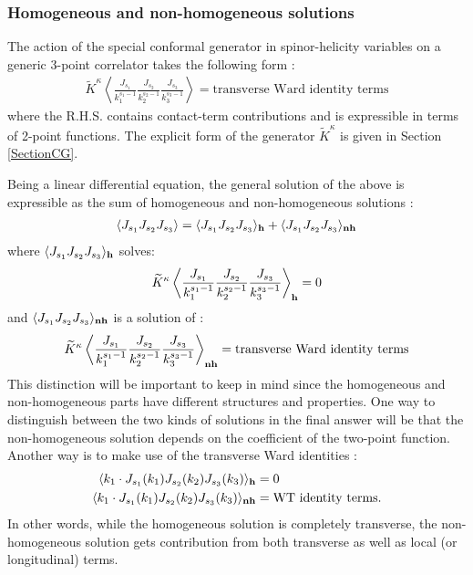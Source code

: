 \documentclass[a4paper,11pt]{article}
\begin{document}
\subsubsection{Homogeneous and non-homogeneous solutions}\label{hnh}
The action of the special conformal generator in spinor-helicity variables on a generic 3-point correlator takes the following form :
%
\begin{align}
\widetilde K^\kappa\left\langle\frac{J_{s_1}}{k_1^{s_{1}-1}}\frac{J_{s_2}}{k_2^{s_{2}-1}}\frac{J_{s_3}}{k_3^{s_{3}-1}}\right\rangle=\text{transverse Ward identity terms}
\end{align}
%
where the R.H.S. contains contact-term contributions and is expressible in terms of 2-point functions. The explicit form of the generator $\widetilde K^\kappa$ is given in Section \ref{SectionCG}.

Being a linear differential equation, the general solution of the above is expressible as the sum of homogeneous and non-homogeneous solutions :
%
\begin{align}
\langle J_{s_1} J_{s_2}J_{s_3}\rangle=\langle J_{s_1} J_{s_2}J_{s_3}\rangle_{\bf{h}}+\langle J_{s_1} J_{s_2}J_{s_3}\rangle_{\bf{nh}}
\end{align}
%
where $\langle J_{s_1} J_{s_2}J_{s_3}\rangle_{\bf{h}}$ solves:
%
\begin{align}
\widetilde K^\kappa\left\langle\frac{J_{s_1}}{k_1^{s_{1}-1}}\frac{J_{s_2}}{k_2^{s_{2}-1}}\frac{J_{s_3}}{k_3^{s_{3}-1}}\right\rangle_{\bf{h}}=0
\end{align}
% 
and $\langle J_{s_1} J_{s_2}J_{s_3}\rangle_{\bf{nh}}$ is a solution of :
%
\begin{align}\label{nhpiece}
\widetilde K^\kappa\left\langle\frac{J_{s_1}}{k_1^{s_{1}-1}}\frac{J_{s_2}}{k_2^{s_{2}-1}}\frac{J_{s_3}}{k_3^{s_{3}-1}}\right\rangle_{\bf{nh}}=\text{transverse Ward identity terms}
\end{align}
%
This distinction will be important to keep in mind since the homogeneous and non-homogeneous parts have different structures and properties. One way to distinguish between the two kinds of solutions in the final answer will be that the non-homogeneous solution depends on the coefficient of the two-point function. Another way is to make use of the transverse Ward identities :
\begin{align}
   \langle k_1\cdot J_{s_1}(k_1) J_{s_2}(k_2)J_{s_3}(k_3)\rangle_{\bf{h}} &=0\notag\\
   \langle k_1\cdot J_{s_1}(k_1) J_{s_2}(k_2)J_{s_3}(k_3)\rangle_{\bf{nh}}&=\rm{WT~identity~terms}.
\end{align}
 In other words, while the homogeneous solution is completely transverse, the non-homogeneous solution gets contribution from both transverse as well as local (or longitudinal) terms.
 
\end{document}
